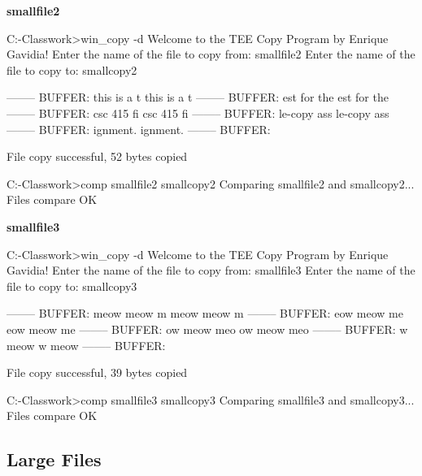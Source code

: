 \documentclass[12pt]{article}
\newcommand {\filename}[1] {\flushleft \textbf{#1}}
\begin{document}
\filename{smallfile2}
\begin{shelloutput}
C:\Users\Enrique\School\OS-Classwork>win_copy -d
Welcome to the TEE Copy Program by Enrique Gavidia!
Enter the name of the file to copy from:
smallfile2
Enter the name of the file to copy to:
smallcopy2

--------
BUFFER: this is a t
this is a t
--------
BUFFER: est for the
est for the
--------
BUFFER:  csc 415 fi
 csc 415 fi
--------
BUFFER: le-copy ass
le-copy ass
--------
BUFFER: ignment.
ignment.
--------
BUFFER:

File copy successful, 52 bytes copied

C:\Users\Enrique\School\OS-Classwork>comp smallfile2 smallcopy2
Comparing smallfile2 and smallcopy2...
Files compare OK
\end{shelloutput}


\filename{smallfile3}
\begin{shelloutput}
C:\Users\Enrique\School\OS-Classwork>win_copy -d
Welcome to the TEE Copy Program by Enrique Gavidia!
Enter the name of the file to copy from:
smallfile3
Enter the name of the file to copy to:
smallcopy3

--------
BUFFER: meow meow m
meow meow m
--------
BUFFER: eow meow me
eow meow me
--------
BUFFER: ow meow meo
ow meow meo
--------
BUFFER: w meow
w meow
--------
BUFFER:

File copy successful, 39 bytes copied

C:\Users\Enrique\School\OS-Classwork>comp smallfile3 smallcopy3
Comparing smallfile3 and smallcopy3...
Files compare OK
\end{shelloutput}


\subsection*{Large Files}
\end{document}
